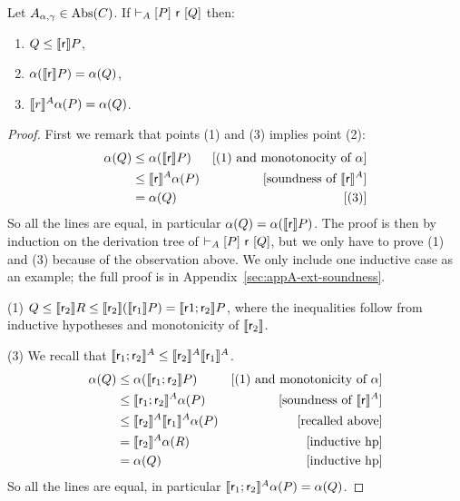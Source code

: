 \begin{theorem}\label{th:lcla:soundness-ext}
	Let $A_{\alpha, \gamma} \in \text{\normalfont Abs}(C)$.
	If $\vdash_{A}\nobreak[P]~\mathsf{r}~[Q]$ then:
	\begin{enumerate}
		\item $Q \le \llbracket\mathsf{r}\rrbracket P$,
		\item $\alpha(\llbracket\mathsf{r}\rrbracket P) = \alpha(Q)$,
		\item $\llbracket r\rrbracket^A \alpha(P) = \alpha(Q)$.
	\end{enumerate}
\end{theorem}
\begin{proof}
	First we remark that points (1) and (3) implies point (2):
	\begin{align*}
		\alpha(Q) &\le \alpha(\llbracket\mathsf{r}\rrbracket P) &[\text{(1) and monotonocity of }\alpha] \\
		&\le \llbracket\mathsf{r}\rrbracket^{A} \alpha(P) &[\text{soundness of }\llbracket\mathsf{r}\rrbracket^{A}] \\
		&= \alpha(Q) &[\text{(3)}]
	\end{align*}
	So all the lines are equal, in particular $\alpha(Q) = \alpha(\llbracket\mathsf{r}\rrbracket P)$.
	The proof is then by induction on the derivation tree of $\vdash_{A}\nobreak[P]~\mathsf{r}~[Q]$, but we only have to prove (1) and (3) because of the observation above.
	We only include one inductive case as an example; the full proof is in Appendix~\ref{sec:appA-ext-soundness}.
	
	\noindent (1) $Q \le \llbracket\mathsf{r}_2\rrbracket R \le \llbracket\mathsf{r}_2\rrbracket (\llbracket\mathsf{r}_1\rrbracket P) = \llbracket\mathsf{r}1; \mathsf{r}_2\rrbracket P$, where the inequalities follow from inductive hypotheses and monotonicity of $\llbracket\mathsf{r}_2\rrbracket$.
	
	\noindent (3) We recall that $\llbracket\mathsf{r}_1; \mathsf{r}_2\rrbracket^{A} \le \llbracket\mathsf{r}_2\rrbracket^{A} \llbracket\mathsf{r}_1\rrbracket^{A}$.
	\begin{align*}
		\alpha(Q) &\le \alpha(\llbracket\mathsf{r}_1; \mathsf{r}_2\rrbracket P) &[\text{(1) and monotonicity of }\alpha] \\
		&\le \llbracket\mathsf{r}_1; \mathsf{r}_2\rrbracket^{A} \alpha(P) &[\text{soundness of }\llbracket\mathsf{r}\rrbracket^{A}] \\
		&\le \llbracket\mathsf{r}_2\rrbracket^{A} \llbracket\mathsf{r}_1\rrbracket^{A} \alpha(P) &[\text{recalled above}] \\
		&= \llbracket\mathsf{r}_2\rrbracket^{A} \alpha(R) &[\text{inductive hp}] \\
		&= \alpha(Q) &[\text{inductive hp}]
	\end{align*}
	So all the lines are equal, in particular $\llbracket\mathsf{r}_1; \mathsf{r}_2\rrbracket^{A} \alpha(P) = \alpha(Q)$.
\end{proof}

